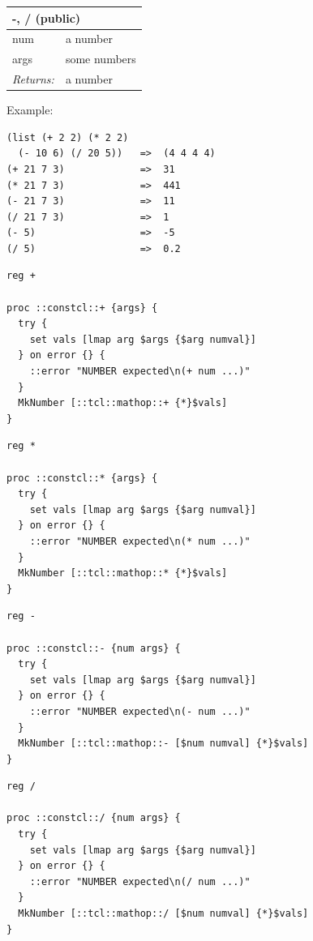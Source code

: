 \documentclass[twoside,9pt]{report}
\begin{document}
\begin{tabular}{ |l l| }
\hline
\multicolumn{2}{|l|}{-, / (public)} \\
\hline
num & a number \\
args & some numbers \\
\textit{Returns:} & a number \\
\hline
\end{tabular}


Example:

\noindent\makebox[\linewidth]{\rule{\linewidth}{0.4pt}}
\begin{lstlisting}
(list (+ 2 2) (* 2 2)
  (- 10 6) (/ 20 5))   =>  (4 4 4 4)
(+ 21 7 3)             =>  31
(* 21 7 3)             =>  441
(- 21 7 3)             =>  11
(/ 21 7 3)             =>  1
(- 5)                  =>  -5
(/ 5)                  =>  0.2
\end{lstlisting}
\noindent\makebox[\linewidth]{\rule{\linewidth}{0.4pt}}
\noindent\makebox[\linewidth]{\rule{\linewidth}{0.4pt}}
\begin{lstlisting}
reg +
 
proc ::constcl::+ {args} {
  try {
    set vals [lmap arg $args {$arg numval}]
  } on error {} {
    ::error "NUMBER expected\n(+ num ...)"
  }
  MkNumber [::tcl::mathop::+ {*}$vals]
}
\end{lstlisting}
\noindent\makebox[\linewidth]{\rule{\linewidth}{0.4pt}}
\noindent\makebox[\linewidth]{\rule{\linewidth}{0.4pt}}
\begin{lstlisting}
reg *
 
proc ::constcl::* {args} {
  try {
    set vals [lmap arg $args {$arg numval}]
  } on error {} {
    ::error "NUMBER expected\n(* num ...)"
  }
  MkNumber [::tcl::mathop::* {*}$vals]
}
\end{lstlisting}
\noindent\makebox[\linewidth]{\rule{\linewidth}{0.4pt}}
\noindent\makebox[\linewidth]{\rule{\linewidth}{0.4pt}}
\begin{lstlisting}
reg -
 
proc ::constcl::- {num args} {
  try {
    set vals [lmap arg $args {$arg numval}]
  } on error {} {
    ::error "NUMBER expected\n(- num ...)"
  }
  MkNumber [::tcl::mathop::- [$num numval] {*}$vals]
}
\end{lstlisting}
\noindent\makebox[\linewidth]{\rule{\linewidth}{0.4pt}}
\noindent\makebox[\linewidth]{\rule{\linewidth}{0.4pt}}
\begin{lstlisting}
reg /
 
proc ::constcl::/ {num args} {
  try {
    set vals [lmap arg $args {$arg numval}]
  } on error {} {
    ::error "NUMBER expected\n(/ num ...)"
  }
  MkNumber [::tcl::mathop::/ [$num numval] {*}$vals]
}
\end{lstlisting}
\noindent\makebox[\linewidth]{\rule{\linewidth}{0.4pt}}
\end{document}
